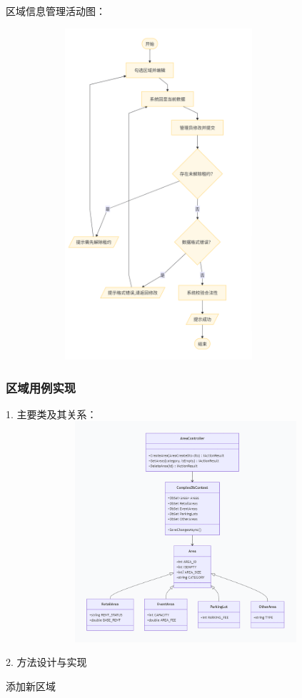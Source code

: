 \documentclass[]{article}
\begin{document}
区域信息管理活动图：

\includegraphics[width=4.45694in,height=4.83819in]{media/media/image_2-3-3.png}

\hypertarget{ux7528ux4f8b-1ux5b9eux73b0}{%
  \subsubsection{区域用例实现}\label{ux7528ux4f8b-1ux5b9eux73b0}}
1. 主要类及其关系：
\includegraphics[width=6.06528in,height=3.22222in]{media/media/image_2-3-4.png}

2. 方法设计与实现

添加新区域
\end{document}
